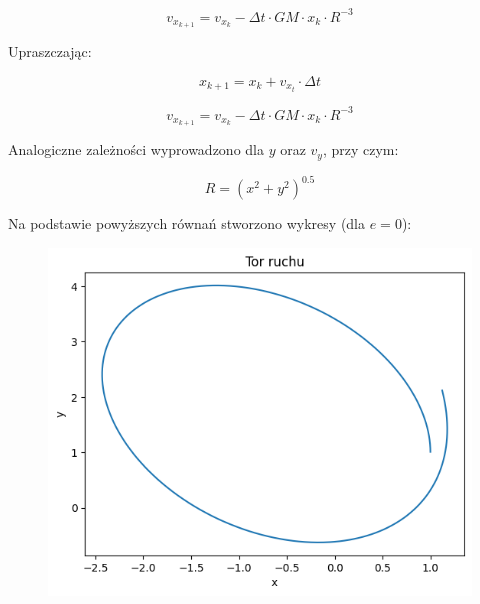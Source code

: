 \documentclass{article}
\begin{document}
	\begin{equation}
		v_{x_{k+1}} = v_{x_k} - \Delta t \cdot GM \cdot x_k \cdot R^{-3}
	\end{equation}

	Upraszczając:

	\begin{equation}
		x_{k+1} = x_k + v_{x_t} \cdot \Delta t
	\end{equation}

	\begin{equation}
		v_{x_{k+1}} = v_{x_k} - \Delta t \cdot GM \cdot x_k \cdot R^{-3}
	\end{equation}

	Analogiczne zależności wyprowadzono dla $y$ oraz $v_y$, przy czym:

	\begin{equation}
		R = (x^2 + y^2) ^ {0.5}
	\end{equation}

	\newpage

	Na podstawie powyższych równań stworzono wykresy (dla $e = 0$):

	\begin{figure}[h]
		\centering
		\includegraphics[scale = 0.5]{wykres1.png}
	\end{figure}
\end{document}
